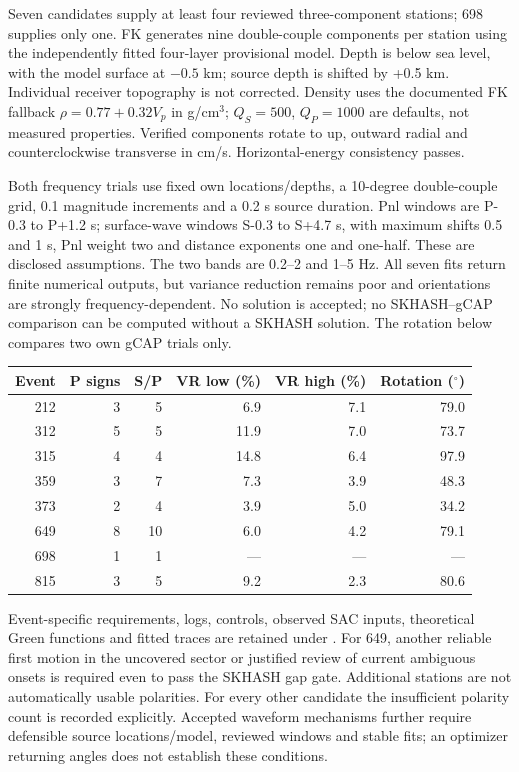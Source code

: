 Seven candidates supply at least four reviewed three-component stations; 698 supplies only one. FK generates nine double-couple components per station using the independently fitted four-layer provisional model. Depth is below sea level, with the model surface at $-0.5$ km; source depth is shifted by +0.5 km. Individual receiver topography is not corrected. Density uses the documented FK fallback $\rho=0.77+0.32V_p$ in g/cm$^3$; $Q_S=500$, $Q_P=1000$ are defaults, not measured properties. Verified components rotate to up, outward radial and counterclockwise transverse in cm/s. Horizontal-energy consistency passes.

Both frequency trials use fixed own locations/depths, a 10-degree double-couple grid, 0.1 magnitude increments and a 0.2 s source duration. Pnl windows are P-0.3 to P+1.2 s; surface-wave windows S-0.3 to S+4.7 s, with maximum shifts 0.5 and 1 s, Pnl weight two and distance exponents one and one-half. These are disclosed assumptions. The two bands are 0.2--2 and 1--5 Hz. All seven fits return finite numerical outputs, but variance reduction remains poor and orientations are strongly frequency-dependent. No solution is accepted; no SKHASH--gCAP comparison can be computed without a SKHASH solution. The rotation below compares two own gCAP trials only.

\begin{center}\small\begin{tabular}{rrrrrr}\toprule Event & P signs & S/P & VR low (\%) & VR high (\%) & Rotation ($^\circ$)\\\midrule
212 & 3 & 5 & 6.9 & 7.1 & 79.0\\
312 & 5 & 5 & 11.9 & 7.0 & 73.7\\
315 & 4 & 4 & 14.8 & 6.4 & 97.9\\
359 & 3 & 7 & 7.3 & 3.9 & 48.3\\
373 & 2 & 4 & 3.9 & 5.0 & 34.2\\
649 & 8 & 10 & 6.0 & 4.2 & 79.1\\
698 & 1 & 1 & --- & --- & ---\\
815 & 3 & 5 & 9.2 & 2.3 & 80.6\\
\bottomrule\end{tabular}\end{center}
Event-specific requirements, logs, controls, observed SAC inputs, theoretical Green functions and fitted traces are retained under . For 649, another reliable first motion in the uncovered sector or justified review of current ambiguous onsets is required even to pass the SKHASH gap gate. Additional stations are not automatically usable polarities. For every other candidate the insufficient polarity count is recorded explicitly. Accepted waveform mechanisms further require defensible source locations/model, reviewed windows and stable fits; an optimizer returning angles does not establish these conditions.

